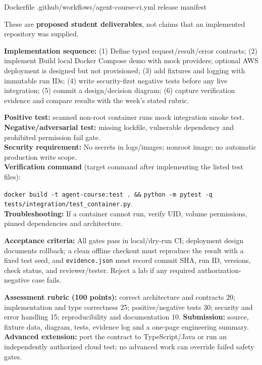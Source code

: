 \documentclass[
  10pt,
]{article}
\newenvironment{Shaded}{\begin{snugshade}}{\end{snugshade}}
\newcommand{\NormalTok}[1]{#1}
\begin{document}
\begin{Shaded}
\begin{Highlighting}[]
\NormalTok{Dockerfile}
\NormalTok{.github/workflows/agent{-}course{-}ci.yml}
\NormalTok{release manifest}
\end{Highlighting}
\end{Shaded}

These are \textbf{proposed student deliverables}, not claims that an
implemented repository was supplied.

{\raggedright \textbf{Implementation sequence:} (1) Define typed request/\allowbreak result/\allowbreak error
contracts; (2) implement Build local Docker Compose demo with mock
providers; optional AWS deployment is designed but not provisioned; (3)
add fixtures and logging with immutable run IDs; (4) write
security-first negative tests before any live integration; (5) commit a
design/\allowbreak decision diagram; (6) capture verification evidence and compare
results with the week's stated rubric.\par}

\textbf{Positive test:} scanned non-root container runs mock integration
smoke test.\\
\textbf{Negative/adversarial test:} missing lockfile, vulnerable
dependency and prohibited permission fail gate.\\
\textbf{Security requirement:} No secrets in logs/images; nonroot image;
no automatic production write scope.\\
\textbf{Verification command} (target command after implementing the
listed test files):\par\noindent
\texttt{docker build -t agent-course:test . \&\&}\allowbreak{} \texttt{python -m pytest -q}\allowbreak{} \nolinkurl{tests/integration/test_container.py}.\\
\textbf{Troubleshooting:} If a container cannot run, verify UID, volume
permissions, pinned dependencies and architecture.

\textbf{Acceptance criteria:} All gates pass in local/dry-run CI;
deployment design documents rollback; a clean offline checkout must
reproduce the result with a fixed test seed, and \texttt{evidence.json}
must record commit SHA, run ID, versions, check status, and
reviewer/tester. Reject a lab if any required authorization-negative
case fails.

\textbf{Assessment rubric (100 points):} correct architecture and
contracts 20; implementation and type correctness 25; positive/negative
tests 30; security and error handling 15; reproducibility and
documentation 10. \textbf{Submission:} source, fixture data, diagram,
tests, evidence log and a one-page engineering summary. \textbf{Advanced
extension:} port the contract to TypeScript/Java or run an independently
authorized cloud test; no advanced work can override failed safety
gates.
\end{document}
